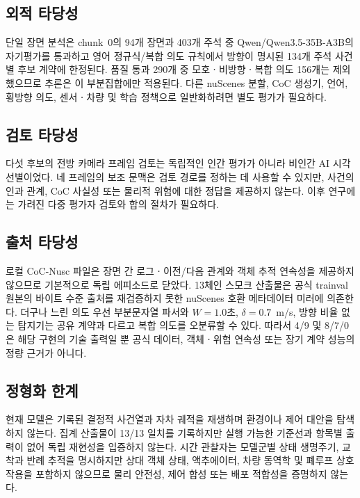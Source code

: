 \subsection{외적 타당성}
단일 장면 분석은 chunk~0의 94개 장면과 403개 주석 중 Qwen/Qwen3.5-35B-A3B의 자기평가를 통과하고 영어 정규식/복합 의도 규칙에서 방향이 명시된 134개 주석 사건별 후보 계약에 한정된다. 품질 통과 290개 중 모호ㆍ비방향ㆍ복합 의도 156개는 제외했으므로 추론은 이 부분집합에만 적용된다. 다른 nuScenes 분할, CoC 생성기, 언어, 횡방향 의도, 센서ㆍ차량 및 학습 정책으로 일반화하려면 별도 평가가 필요하다.

\subsection{검토 타당성}
다섯 후보의 전방 카메라 프레임 검토는 독립적인 인간 평가가 아니라 비인간 AI 시각 선별이었다. 네 프레임의 보조 문맥은 검토 경로를 정하는 데 사용할 수 있지만, 사건의 인과 관계, CoC 사실성 또는 물리적 위험에 대한 정답을 제공하지 않는다. 이후 연구에는 가려진 다중 평가자 검토와 합의 절차가 필요하다.

\subsection{출처 타당성}
로컬 CoC-Nusc 파일은 장면 간 로그ㆍ이전/다음 관계와 객체 추적 연속성을 제공하지 않으므로 기본적으로 독립 에피소드로 닫았다. 13체인 스모크 산출물은 공식 trainval 원본의 바이트 수준 출처를 재검증하지 못한 nuScenes 호환 메타데이터 미러에 의존한다. 더구나 느린 의도 우선 부분문자열 파서와 $W=1.0$초, $\delta=0.7$~m/s, 방향 비율 없는 탐지기는 공유 계약과 다르고 복합 의도를 오분류할 수 있다. 따라서 4/9 및 8/7/0은 해당 구현의 기술 출력일 뿐 공식 데이터, 객체ㆍ위험 연속성 또는 장기 계약 성능의 정량 근거가 아니다.

\subsection{정형화 한계}
현재 모델은 기록된 결정적 사건열과 자차 궤적을 재생하며 환경이나 제어 대안을 탐색하지 않는다. 집계 산출물이 13/13 일치를 기록하지만 실행 가능한 기준선과 항목별 출력이 없어 독립 재현성을 입증하지 않는다. 시간 관찰자는 모델군별 상태 생명주기, 교착과 반례 추적을 명시하지만 상대 객체 상태, 액추에이터, 차량 동역학 및 폐루프 상호작용을 포함하지 않으므로 물리 안전성, 제어 합성 또는 배포 적합성을 증명하지 않는다.
